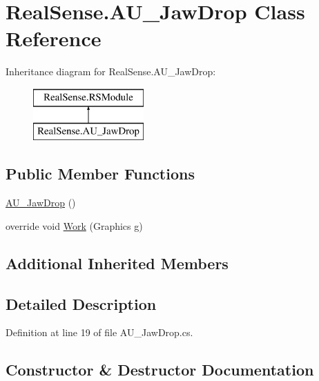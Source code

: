 \hypertarget{class_real_sense_1_1_a_u___jaw_drop}{}\section{Real\+Sense.\+A\+U\+\_\+\+Jaw\+Drop Class Reference}
\label{class_real_sense_1_1_a_u___jaw_drop}
Inheritance diagram for Real\+Sense.\+A\+U\+\_\+\+Jaw\+Drop\+:\begin{figure}[H]
\begin{center}
\leavevmode
\includegraphics[height=2.000000cm]{class_real_sense_1_1_a_u___jaw_drop}
\end{center}
\end{figure}
\subsection*{Public Member Functions}
\begin{DoxyCompactItemize}
\item 
\hyperlink{class_real_sense_1_1_a_u___jaw_drop_a28f51c63dfbf79d8315c689b6ae2b65b}{A\+U\+\_\+\+Jaw\+Drop} ()
\item 
override void \hyperlink{class_real_sense_1_1_a_u___jaw_drop_aed90ca88a1c563016c6af39fd65f81e4}{Work} (Graphics g)
\end{DoxyCompactItemize}
\subsection*{Additional Inherited Members}


\subsection{Detailed Description}


Definition at line 19 of file A\+U\+\_\+\+Jaw\+Drop.\+cs.



\subsection{Constructor \& Destructor Documentation}
\mbox{\label{class_real_sense_1_1_a_u___jaw_drop_a28f51c63dfbf79d8315c689b6ae2b65b}} 

